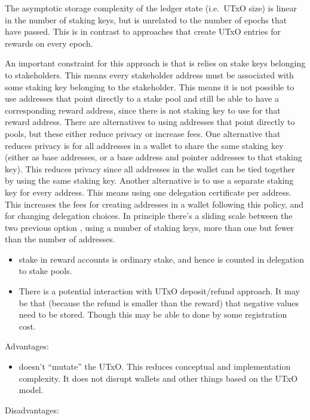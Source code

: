 \documentclass[11pt,a4paper]{article}
\begin{document}
The asymptotic storage complexity of the ledger state (i.e.~UTxO size)
is linear in the number of staking keys, but is unrelated to the number of
epochs that have passed. This is in contrast to approaches that create
UTxO entries for rewards on every epoch.

An important constraint for this approach is that is relies on stake
keys belonging to stakeholders. This means every stakeholder address
must be associated with some staking key belonging to the stakeholder.
This means it is not possible to use addresses that point directly to a
stake pool and still be able to have a corresponding reward address,
since there is not staking key to use for that reward address. There are
alternatives to using addresses that point directly to pools, but these
either reduce privacy or increase fees. One alternative that reduces
privacy is for all addresses in a wallet to share the same staking key
(either as base addresses, or a base address and pointer addresses to
that staking key). This reduces privacy since all addresses in the wallet
can be tied together by using the same staking key. Another alternative is
to use a separate staking key for every address. This means using one
delegation certificate per address. This increases the fees for creating
addresses in a wallet following this policy, and for changing delegation
choices. In principle there's a sliding scale between the two previous
option , using a number of staking keys, more than one but fewer than the
number of addresses.

\begin{itemize}
\item
  stake in reward accounts is ordinary stake, and hence is counted in
  delegation to stake pools.
\item
  There is a potential interaction with UTxO deposit/refund approach. It
  may be that (because the refund is smaller than the reward) that
  negative values need to be stored. Though this may be able to done by
  some registration cost.
\end{itemize}

Advantages:

\begin{itemize}
\item
  doesn't ``mutate'' the UTxO. This reduces conceptual and
  implementation complexity. It does not disrupt wallets and other
  things based on the UTxO model.
\end{itemize}

Disadvantages:
\end{document}

